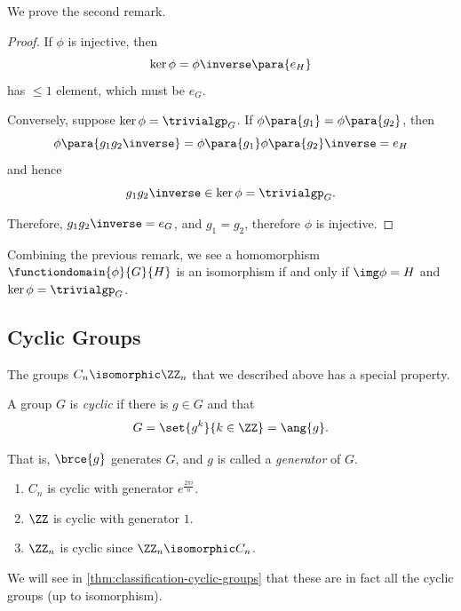 We prove the second remark.

\begin{proof}
    If \(\phi\) is injective, then
    \[
        \ker \phi = \phi\inverse\para{e_H}
    \]
    has \(\leq 1\) element, which must be \(e_G\).

    Conversely, suppose \(\ker \phi = \trivialgp_G\). If \(\phi\para{g_1} = \phi\para{g_2}\), then
    \[
        \phi\para{g_1 g_2\inverse} = \phi\para{g_1} \phi\para{g_2}\inverse = e_H
    \]
    and hence
    \[
        g_1 g_2\inverse \in \ker \phi = \trivialgp_G.
    \]

    Therefore, \(g_1 g_2\inverse = e_G\), and \(g_1 = g_2\), therefore \(\phi\) is injective.
\end{proof}

\begin{remark}
    Combining the previous remark, we see a homomorphism \(\functiondomain{\phi}{G}{H}\) is an isomorphism if and only if \(\img \phi = H\) and \(\ker \phi = \trivialgp_G\).
\end{remark}

\subsection{Cyclic Groups}
\label{sec:cyclic-groups}

The groups \(C_n \isomorphic \ZZ_n\) that we described above has a special property.

\begin{definition}
    \label{def:cyclic-group}%
    A group \(G\) is \emph{cyclic} if there is \(g \in G\) and that
    \[
        G = \set{g^k}{k \in \ZZ} = \ang{g}.
    \]

    That is, \(\brce{g}\) generates \(G\), and \(g\) is called a \emph{generator} of \(G\).
\end{definition}

\begin{examples}
    \begin{enumerate}
        \item \(C_n\) is cyclic with generator \(e^{\frac{2 \pi i}{n}}\).
        \item \(\ZZ\) is cyclic with generator \(1\).
        \item \(\ZZ_n\) is cyclic since \(\ZZ_n \isomorphic C_n\).
    \end{enumerate}
\end{examples}

We will see in \autoref{thm:classification-cyclic-groups} that these are in fact all the cyclic groups (up to isomorphism).

